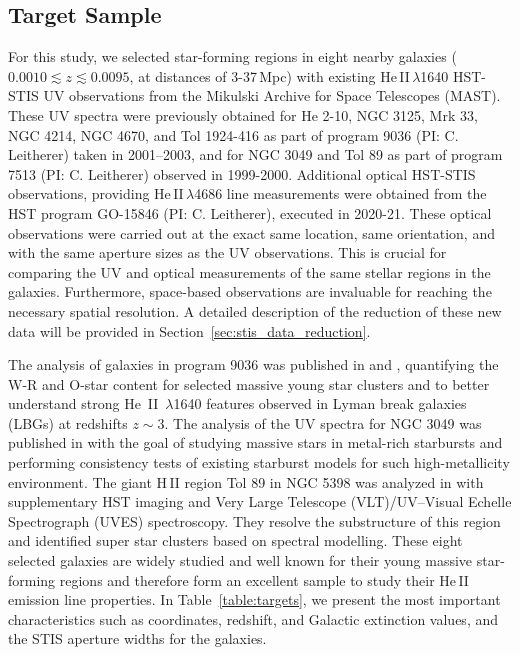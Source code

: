 \documentclass[]{aastex63}
\begin{document}
\subsection{Target Sample}\label{ssect:sample}
For this study, we selected star-forming regions in eight nearby galaxies (${ 0.0010 \lesssim z \lesssim 0.0095}$, at distances of 3-37\,Mpc) with existing He\,II\,$\lambda$1640 HST-STIS UV observations from the Mikulski Archive for Space Telescopes (MAST). These UV spectra were previously obtained for He 2-10, NGC 3125, Mrk 33, NGC 4214, NGC 4670, and Tol 1924-416 as part of program 9036 (PI: C. Leitherer) taken in 2001–2003, and for NGC 3049 and Tol 89 as part of program 7513 (PI: C. Leitherer) observed in 1999-2000. 
Additional optical HST-STIS observations, providing He\,II\,$\lambda$4686 line measurements were obtained from the HST program GO-15846 (PI: C. Leitherer), executed in 2020-21. These optical observations were carried out at the exact same location, same orientation, and with the same aperture sizes as the UV observations. This is crucial for comparing the UV and optical measurements of the same stellar regions in the galaxies. Furthermore, space-based observations are invaluable for reaching the necessary spatial resolution. A detailed description of the reduction of these new data will be provided in Section~\ref{sec:stis_data_reduction}. 

The analysis of galaxies in program 9036 was published in \citet{chandar_ngc_2004} and \citet{chandar_stellar_2005}, quantifying the W-R and O-star content for selected massive young star clusters and to better understand strong He~II~$\lambda$1640 features observed in Lyman break galaxies (LBGs) at redshifts $z\sim3$.
The analysis of the UV spectra for NGC 3049 was published in \cite{gonzalez_delgado_massive_2002} with the goal of studying massive stars in metal-rich starbursts and performing consistency tests of existing starburst models for such high-metallicity environment.
The giant H\,II region Tol 89 in NGC 5398 was analyzed in \cite{sidoli_massive_2006} with supplementary HST imaging and Very Large Telescope (VLT)/UV–Visual Echelle Spectrograph (UVES) spectroscopy. They resolve the substructure of this region and identified super star clusters based on spectral modelling.  
These eight selected galaxies are widely studied and well known for their young massive star-forming regions and therefore form an excellent sample to study their He\,II emission line properties.
In Table~\ref{table:targets}, we present the most important characteristics such as coordinates, redshift, and Galactic extinction values, and the STIS aperture widths for the galaxies.

\end{document}
